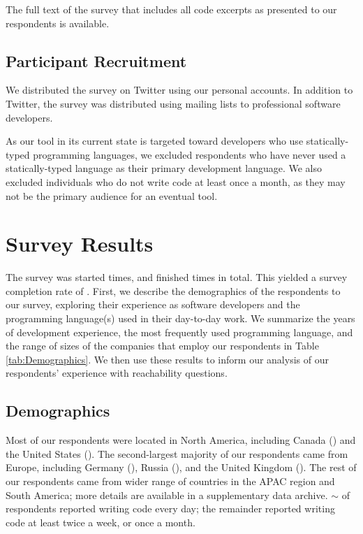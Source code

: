 The full text of the survey that includes all code excerpts as presented to
our respondents is available.

\subsection{Participant Recruitment}
\label{subsec:ParticipantRecruitment}

\noindent
We distributed the survey on Twitter using our personal accounts.
In addition to Twitter, the survey was distributed using mailing lists to
professional software developers.

\par As our tool in its current state is targeted toward developers who
use statically-typed programming languages, we excluded respondents who have
never used a statically-typed language as their primary development language.
We also excluded individuals who do not write code at least once a month,
as they may not be the primary audience for an eventual tool.

\section{Survey Results}
\label{sec:SurveyResults}

The survey was started \numStarted{} times, and finished \numFinished{} times
in total. 
This yielded a survey completion rate of \printpcnt{\numFinished}{\numStarted}.
First, we describe the demographics of the respondents to our survey, exploring
their experience as software developers and the programming language(s) used
in their day-to-day work. 
We summarize the years of development experience, the most frequently
used programming language, and the range of sizes of the companies that employ
our respondents in Table \ref{tab:Demographics}.
We then use these results to inform our analysis of our respondents' experience
with reachability questions.

\subsection{Demographics}
\label{subsec:Demographics}

Most of our respondents were located in North America, including Canada 
(\canada{})
and the United States (\usa{}).
The second-largest majority of our respondents came from Europe, including
Germany (\germany{}), Russia (\russia{}), and the United Kingdom (\uk{}).
The rest of our respondents came from wider range of countries in the APAC
region and South America; more details are available in a supplementary data 
archive.
$\sim$\printpcnt{\writeCodeDaily}{\numFinished} of respondents reported 
writing code every day; the remainder reported writing code at least twice a
week, or once a month.

